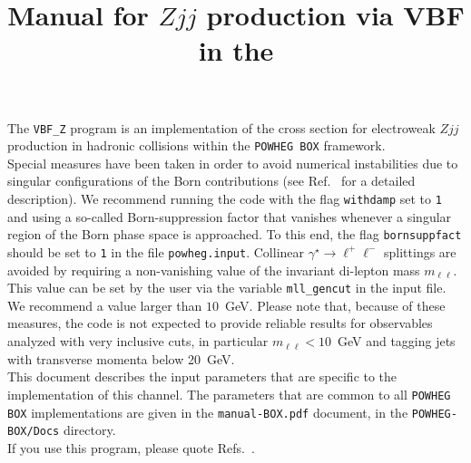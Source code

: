 \documentclass[a4paper,11pt]{article}
\title{Manual for $Zjj$ production via VBF in the \POWHEGBOX{}}
\date{}
\def\pbox{{\tt POWHEG BOX}}
\begin{document}
\maketitle
%
\noindent
The {\tt VBF\_Z} program is an implementation of the cross section for electroweak
$Z jj$ production in hadronic collisions within the \pbox{} framework. 
%
\\[2ex]
%
Special measures have been taken in order to avoid numerical instabilities due to singular configurations of the Born contributions (see Ref.~\cite{JSZ} for a detailed description). We recommend running the code with the flag {\tt withdamp} set to {\tt 1} and using a so-called Born-suppression factor that vanishes whenever a singular region of the Born phase space is approached. To this end, the flag {\tt bornsuppfact} should be set to {\tt 1} in the file {\tt powheg.input}. Collinear $\gamma^\star\to \ell^+\ell^-$ splittings are avoided by requiring a non-vanishing value of the invariant di-lepton mass $m_{\ell\ell}$. This value can be set by the user via the variable {\tt mll\_gencut} in the input file. We recommend a value larger than $10$~GeV. 
%
Please note that, because of these measures, the code is not expected to provide reliable results for observables analyzed with very inclusive cuts, in particular $m_{\ell\ell}<10$~GeV and tagging jets with transverse momenta below 20~GeV. 
%
\\[2ex]
%
This document describes the input parameters that are specific to the
implementation of this channel. 
%
The parameters that are common to all {\tt POWHEG BOX} implementations are given in
the {\tt manual-BOX.pdf} document, in the {\tt POWHEG-BOX/Docs}
directory.
\\[2ex]
If you use this program, please quote
Refs.~\cite{JSZ,Alioli:2010xd}.
\end{document}
